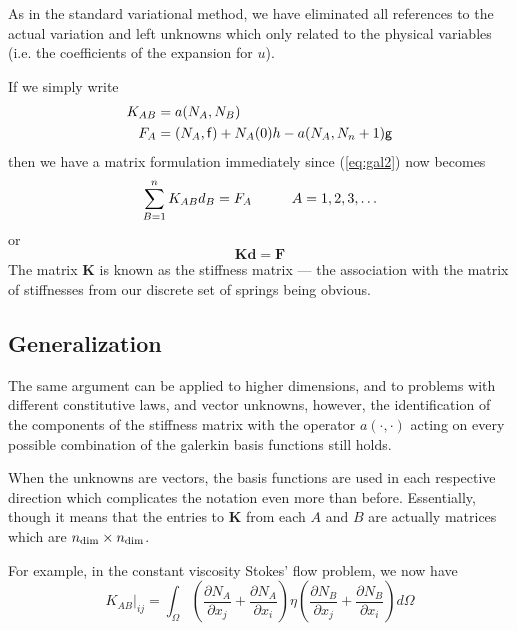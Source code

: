 \documentclass[10pt]{article}
\newcommand{\curly}{\sf }
\begin{document}
	As in the standard variational method, we have eliminated all
	references to the actual variation and left unknowns which only
	related to the physical variables (i.e. the coefficients of the expansion
	for $u$).
	
	If we simply write
		\begin{equation}
			\begin{split}
				K_{AB} &= a(N_A,N_B)\\
				F_A &= (N_A,{\curly f}) + N_A(0)h - a(N_A,N_n+1){\curly g}
			\end{split}
			\label{eq:FEstdform}
		\end{equation}
	then we have a matrix formulation immediately since (\ref{eq:gal2}) now becomes
		\begin{equation}
			\sum_{B=1}^n  K_{AB} d_B = F_A  \makebox[1cm]{} A=1,2,3,\ldots
		\end{equation}
	or 
		\begin{equation}
			\mathbf{K d} = \mathbf{F}
		\end{equation}
	The matrix $\mathbf{K}$ is known as the stiffness matrix --- the 
	association with the matrix of stiffnesses from our discrete set of springs
	being obvious.
		
	\subsection{Generalization}
	
	The same argument can be applied to higher dimensions, and to problems
	with different constitutive laws, and 
	vector unknowns, however, the identification of the 
	components of the stiffness matrix with the operator $a(\cdot,\cdot)$ acting on
	every possible combination of the galerkin basis functions still holds.
	
	When the unknowns are vectors, the basis functions are used in each respective
	direction which complicates the notation even more than before. Essentially, though
	it means that the entries to $\mathbf{K}$ from each $A$ and $B$ are actually
	matrices which are $n_{\rm dim} \times n_{\rm dim}$.
	
	For example, in the constant viscosity Stokes' flow problem, we now have
		\begin{equation}
			\left. K_{AB}\right|_{ij}  = 	\int_\Omega
							\left(  \frac{\partial N_A}{\partial x_j} +  \frac{\partial N_A}{\partial x_i}  \right) \eta
							\left(  \frac{\partial N_B}{\partial x_j} +  \frac{\partial N_B}{\partial x_i} \right) d \Omega
				\label{eq:festokes}			
		\end{equation}
		
\end{document}

